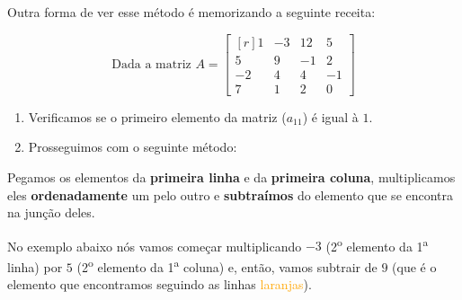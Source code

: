 Outra forma de ver esse método é memorizando a seguinte receita:

$$
\text{Dada a matriz }A=\begin{bmatrix*}[r]
1 & -3 & 12 & 5 \\
5 & 9 & -1 & 2 \\
-2 & 4 & 4 & -1 \\
7 & 1 & 2 & 0 
\end{bmatrix*}
$$

\begin{enumerate}
    \item Verificamos se o primeiro elemento da matriz ($a_{11}$) é igual à $1$. \checkmark
    \item Prosseguimos com o seguinte método:
\end{enumerate}

Pegamos os elementos da \textbf{primeira linha} e da \textbf{primeira coluna}, multiplicamos eles \textbf{ordenadamente} um pelo outro e \textbf{subtraímos} do elemento que se encontra na junção deles.

No exemplo abaixo nós vamos começar multiplicando $-3$ (2\textsuperscript{o} elemento da 1\textsuperscript{a} linha) por $5$ (2\textsuperscript{o} elemento da 1\textsuperscript{a} coluna) e, então, vamos subtrair de $9$ (que é o elemento que encontramos seguindo as linhas \textcolor{orange}{laranjas}).

\begin{center}
\hspace{-43pt}
\end{center}

